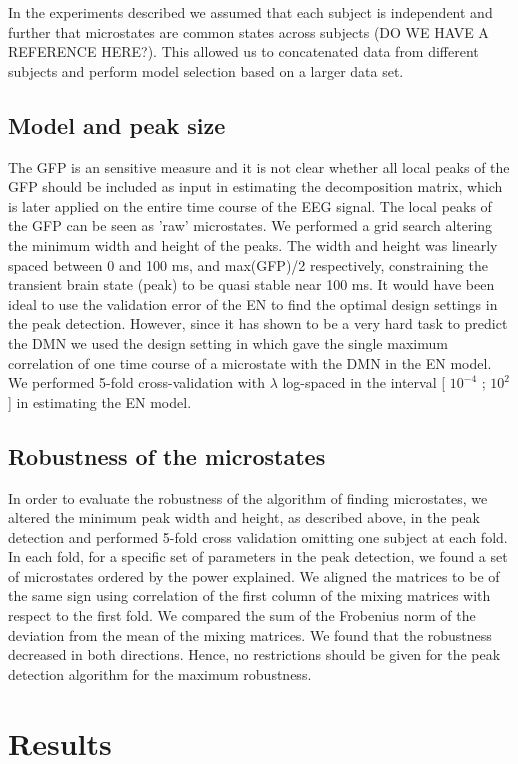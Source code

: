 \documentclass{article}
\begin{document}
In the experiments described we assumed that each subject is independent and further that microstates are common states across subjects (DO WE HAVE A REFERENCE HERE?). This allowed us to concatenated data from different subjects and perform model selection based on a larger data set.
\subsection{Model and peak size}
The GFP is an sensitive measure and it is not clear whether all local peaks of the GFP should be included as input in estimating the decomposition matrix, which is later applied on the entire time course of the EEG signal. The local peaks of the GFP can be seen as 'raw' microstates. We performed a grid search altering the minimum width and height of the peaks. The width and height was linearly spaced between 0 and 100 ms, and max(GFP)/2 respectively, constraining the transient brain state (peak) to be quasi stable near 100 ms.
It would have been ideal to use the validation error of the EN to find the optimal design settings in the peak detection. However, since it has shown to be a very hard task to predict the DMN we used the design setting in which gave the single maximum correlation of one time course of a microstate with the DMN in the EN model.
We performed 5-fold cross-validation with $\lambda$ log-spaced in the interval 
[ $10^{-4}$ ; $10^2$] in estimating the EN model.
\subsection{Robustness of the microstates}
In order to evaluate the robustness of the algorithm of finding microstates, we altered the minimum peak width and height, as described above, in the peak detection and performed 5-fold cross validation omitting one subject at each fold. In each fold, for a specific set of parameters in the peak detection, we found a set of microstates ordered by the power explained. We aligned the matrices to be of the same sign using correlation of the first column of the mixing matrices with respect to the first fold. We compared the sum of the Frobenius norm of the deviation from the mean of the mixing matrices. We found that the robustness decreased in both directions. Hence, no restrictions should be given for the peak detection algorithm for the maximum robustness.
\section{Results}
\end{document}
